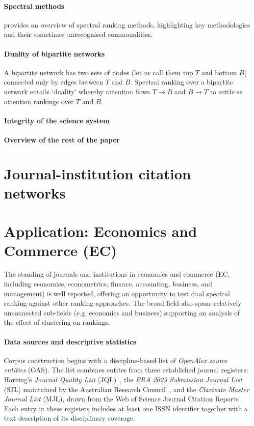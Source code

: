 \documentclass[10pt]{article}
\begin{document}
\paragraph{Spectral methods}
\cite{vignaSpectralRanking2016} provides an overview of spectral ranking methods, highlighting key methodologies and their sometimes unrecognised commonalities. 

\paragraph{Duality of bipartite networks}
A bipartite network has two sets of nodes (let us call them top $T$ and bottom $B$) connected only by edges between $T$ and $B$. Spectral ranking over a bipartite network entails `duality' \citep[e.g. ][]{breigerDualityPersonsGroups1974a} whereby attention flows $T \rightarrow B$ and $B \rightarrow T$ to settle ss attention rankings over $T$ and $B$. 

\paragraph{Integrity of the science system}

\paragraph{Overview of the rest of the paper}

\section{Journal-institution citation networks}



\section{Application: Economics and Commerce (EC)}
The standing of journals and institutions in economics and commerce (EC, including economics, econometrics, finance, accounting, business, and management) is well reported, offering an opportunity to test dual spectral ranking against other ranking approaches. The broad field also spans relatively unconnected sub-fields (e.g. economics and business) supporting an analysis of the effect of clustering on rankings.


\paragraph{Data sources and descriptive statistics}
Corpus construction begins with a discipline-based list of \textit{OpenAlex source entities} (OAS).
The list combines entries from three established journal registers:
Harzing's \textit{Journal Quality List} (JQL)~\cite{harzing_jql},
the \textit{ERA 2023 Submission Journal List} (SJL) maintained by the Australian Research Council~\cite{arc_era2023},
and the \textit{Clarivate Master Journal List} (MJL), drawn from the Web of Science Journal Citation Reports~\cite{clarivate_mjl}.
Each entry in these registers includes at least one ISSN identifier together with a text description of its disciplinary coverage.
\end{document}
